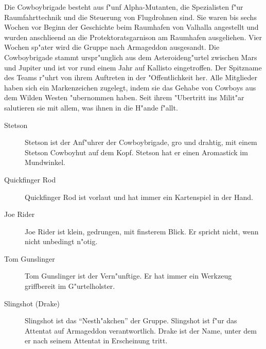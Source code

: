 
Die Cowboybrigade besteht aus f"unf Alpha-Mutanten, die Spezialisten f"ur Raumfahrttechnik und die Steuerung von Flugdrohnen sind. Sie waren bis sechs Wochen vor Beginn der Geschichte beim Raumhafen von Valhalla angestellt und wurden anschlie\3end an die Protektoratsgarnison am Raumhafen ausgeliehen. Vier Wochen sp"ater wird die Gruppe nach Armageddon ausgesandt. Die Cowboybrigade stammt urspr"unglich aus dem Asteroideng"urtel zwischen Mars und Jupiter und ist vor rund einem Jahr auf Kallisto eingetroffen. Der Spitzname des Teams r"uhrt von ihrem Auftreten in der "Offentlichkeit her. Alle Mitglieder haben sich ein Markenzeichen zugelegt, indem sie das Gehabe von Cowboys aus dem Wilden Westen "ubernommen haben. Seit ihrem "Ubertritt ins Milit"ar salutieren sie mit allem, was ihnen in die H"ande f"allt.

\begin{description}
    \item[Stetson] Stetson ist der Anf"uhrer der Cowboybrigade, gro\3 und drahtig, mit einem Stetson Cowboyhut auf dem Kopf. Stetson hat er 
        einen Aromastick im Mundwinkel.
    \item[Quickfinger Rod] Quickfinger Rod ist vorlaut und hat immer ein Kartenspiel in der Hand.
    \item[Joe Rider] Joe Rider ist klein, gedrungen, mit finsterem Blick. Er spricht nicht, wenn nicht unbedingt n"otig.
    \item[Tom Gunslinger] Tom Gunslinger ist der Vern"unftige. Er hat immer ein Werkzeug griffbereit im G"urtelholster.
    \item[Slingshot (Drake)]  Slingshot ist das ``Nesth"akchen'' der Gruppe. Slingshot ist f"ur das Attentat auf Armageddon verantwortlich. 
        Drake ist der Name, unter dem er nach seinem Attentat in Erscheinung tritt.
\end{description}

\newpage
